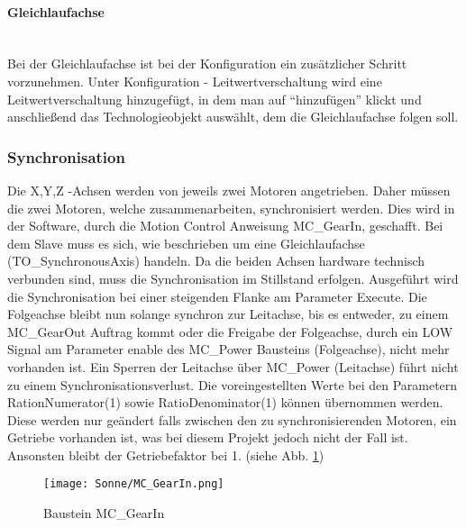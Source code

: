 \paragraph{Gleichlaufachse} \mbox{} \\
Bei der Gleichlaufachse ist bei der Konfiguration ein zusätzlicher Schritt vorzunehmen. Unter Konfiguration - Leitwertverschaltung wird eine Leitwertverschaltung hinzugefügt, in dem man auf ``hinzufügen'' klickt und anschließend das Technologieobjekt auswählt, dem die Gleichlaufachse folgen soll.



\subsubsection{Synchronisation}
Die X,Y,Z -Achsen werden von jeweils zwei Motoren angetrieben. Daher müssen die zwei Motoren, welche zusammenarbeiten, synchronisiert werden. Dies wird in der Software, durch die Motion Control Anweisung MC\_GearIn, geschafft. Bei dem Slave muss es sich, wie beschrieben um eine Gleichlaufachse (TO\_SynchronousAxis) handeln. Da die beiden Achsen hardware technisch verbunden sind, muss die Synchronisation im Stillstand erfolgen. Ausgeführt wird die Synchronisation bei einer steigenden Flanke am Parameter Execute. Die Folgeachse bleibt nun solange synchron zur Leitachse, bis es entweder, zu einem MC\_GearOut Auftrag kommt oder die Freigabe der Folgeachse, durch ein LOW Signal am Parameter enable des MC\_Power Bausteins (Folgeachse), nicht mehr vorhanden ist. Ein Sperren der Leitachse über MC\_Power (Leitachse) führt nicht zu einem Synchronisationsverlust. Die voreingestellten Werte bei den Parametern RationNumerator(1) sowie RatioDenominator(1) können übernommen werden. Diese werden nur geändert falls zwischen den zu synchronisierenden Motoren, ein Getriebe vorhanden ist, was bei diesem Projekt jedoch nicht der Fall ist. Ansonsten bleibt der Getriebefaktor bei 1. (siehe Abb. \ref{MC_GearIn})

\begin{figure}[h]
    \centering
    \texttt{[image: Sonne/MC\_GearIn.png]}    
    \caption{Baustein MC\_GearIn}
    \label{MC_GearIn}
\end{figure}

